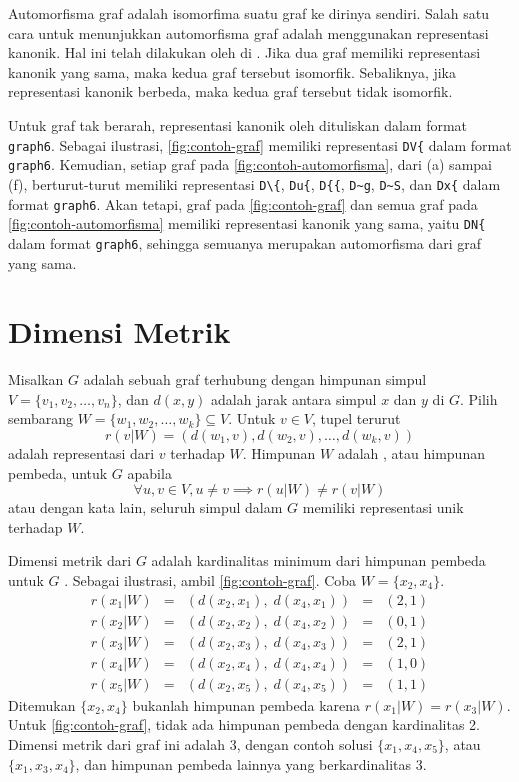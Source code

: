 Automorfisma graf adalah isomorfima suatu graf ke dirinya sendiri. Salah satu cara untuk menunjukkan automorfisma graf adalah menggunakan representasi kanonik. Hal ini telah dilakukan oleh \citeauthor{mckay2014} di \citeyear{mckay2014}. Jika dua graf memiliki representasi kanonik yang sama, maka kedua graf tersebut isomorfik. Sebaliknya, jika representasi kanonik berbeda, maka kedua graf tersebut tidak isomorfik.

Untuk graf tak berarah, representasi kanonik oleh \citeauthor{mckay2014} dituliskan dalam format \verb`graph6`. Sebagai ilustrasi, \autoref{fig:contoh-graf} memiliki representasi \verb`DV{` dalam format \verb`graph6`. Kemudian, setiap graf pada \autoref{fig:contoh-automorfisma}, dari (a) sampai (f), berturut-turut memiliki representasi \verb`D\{`, \verb`Du{`,  \verb`D{{`,  \verb`D~g`,  \verb`D~S`,  dan \verb`Dx{` dalam format \verb`graph6`. Akan tetapi, graf pada \autoref{fig:contoh-graf} dan semua graf pada \autoref{fig:contoh-automorfisma} memiliki representasi kanonik yang sama, yaitu \verb`DN{` dalam format \verb`graph6`, sehingga semuanya merupakan automorfisma dari graf yang sama.

\section{Dimensi Metrik}

Misalkan \(G\) adalah sebuah graf terhubung dengan himpunan simpul \(V = \{v_1, v_2, \ldots, v_n\}\), dan \(d(x, y)\) adalah jarak antara simpul \(x\) dan \(y\) di \(G\). Pilih sembarang \(W = \{w_1, w_2, \ldots, w_k\} \subseteq V\). Untuk \(v \in V\), tupel terurut
	\[ r(v|W) = (d(w_1, v), d(w_2, v), \ldots, d(w_k, v)) \]
adalah representasi dari \(v\) terhadap \(W\). Himpunan \(W\) adalah , atau himpunan pembeda, untuk \(G\) apabila
	\[ \forall u, v \in V, u \neq v \implies r(u|W) \neq r(v|W) \]
atau dengan kata lain, seluruh simpul dalam \(G\) memiliki representasi unik terhadap \(W\).

Dimensi metrik dari \(G\) adalah kardinalitas minimum dari himpunan pembeda untuk \(G\) \citep{tillquist2023}. Sebagai ilustrasi, ambil \autoref{fig:contoh-graf}. Coba \(W = \{x_2, x_4\}\).
\[
\begin{array}{ccccc}
	r(x_1|W) & = & ( d(x_2, x_1), \; d(x_4, x_1) ) & = & (2, 1) \\
	r(x_2|W) & = & ( d(x_2, x_2), \; d(x_4, x_2) ) & = & (0, 1) \\
	r(x_3|W) & = & ( d(x_2, x_3), \; d(x_4, x_3) ) & = & (2, 1) \\
	r(x_4|W) & = & ( d(x_2, x_4), \; d(x_4, x_4) ) & = & (1, 0) \\
	r(x_5|W) & = & ( d(x_2, x_5), \; d(x_4, x_5) ) & = & (1, 1)
\end{array}
\]
Ditemukan \(\{x_2, x_4\}\) bukanlah himpunan pembeda karena \(r(x_1|W) = r(x_3|W)\). Untuk \autoref{fig:contoh-graf}, tidak ada himpunan pembeda dengan kardinalitas 2. Dimensi metrik dari graf ini adalah 3, dengan contoh solusi \(\{x_1, x_4, x_5\}\), atau \(\{x_1, x_3, x_4\}\), dan himpunan pembeda lainnya yang berkardinalitas 3.

